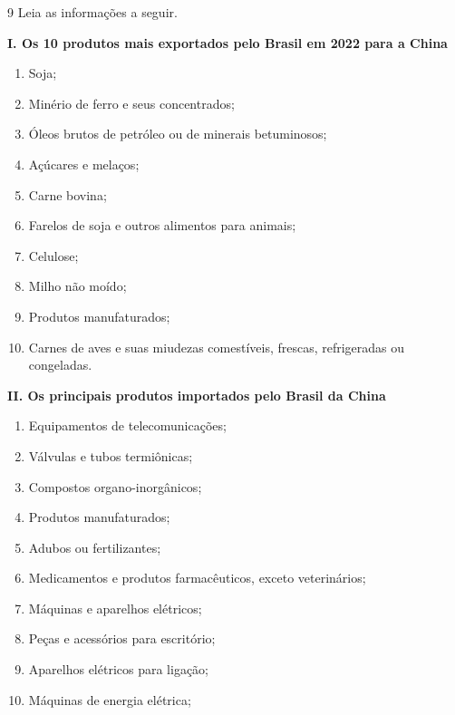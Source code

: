 \num{9} Leia as informações a seguir.

\textbf{I. Os 10 produtos mais exportados pelo Brasil em 2022 para a China}

\begin{enumerate}
\item Soja;
\item Minério de ferro e seus concentrados;
\item Óleos brutos de petróleo ou de minerais betuminosos;
\item Açúcares e melaços;
\item Carne bovina;
\item Farelos de soja e outros alimentos para animais;
\item Celulose;
\item Milho não moído;
\item Produtos manufaturados;
\item Carnes de aves e suas miudezas comestíveis, frescas, refrigeradas ou congeladas.
\end{enumerate}


\textbf{II. Os principais produtos importados pelo Brasil da China}

\begin{enumerate}
\item
  Equipamentos de telecomunicações;
\item
  Válvulas e tubos termiônicas;
\item
  Compostos organo-inorgânicos;
\item
  Produtos manufaturados;
\item
  Adubos ou fertilizantes;
\item
  Medicamentos e produtos farmacêuticos, exceto veterinários;
\item
  Máquinas e aparelhos elétricos;
\item
  Peças e acessórios para escritório;
\item
  Aparelhos elétricos para ligação;
\item
  Máquinas de energia elétrica;
\end{enumerate}


